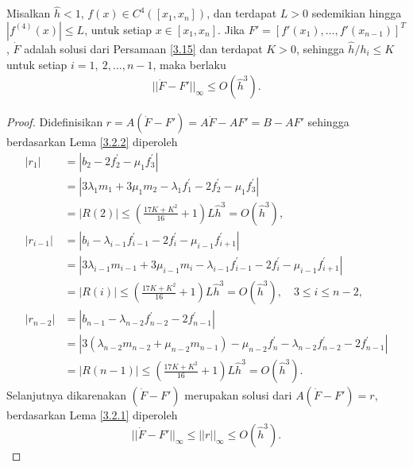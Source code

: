 \begin{teorema}\label{3.3.3}
    Misalkan $\hat{h}<1$, $f(x)\in C^4([x_1,x_n])$, dan terdapat $L>0$ sedemikian hingga $|f^{(4)}(x)| \leq L$, untuk setiap $x\in[x_1,x_n]$. Jika $F'=[f'(x_1),\dots,f'(x_{n-1})]^T$, $\dot{F}$ adalah solusi dari Persamaan \eqref{3.15} dan terdapat $K>0$, sehingga $\hat{h}/h_i \leq K$ untuk setiap $i=1,~2,\dots,n-1$, maka berlaku
    \begin{align*}
        ||\dot{F}-F'||_\infty \leq O(\hat{h}^3).
    \end{align*}
\end{teorema}
\begin{proof}
    Didefinisikan $r=A(\dot{F}-F')=A\dot{F}-AF'=B-AF'$ sehingga berdasarkan Lema \ref{3.2.2} diperoleh
    \begin{align*}
        |r_1|& =\left|b_2-2 f_2^{\prime}-\mu_1 f_3^{\prime}\right|\\
        &=\left|3 \lambda_1 m_1+3 \mu_1 m_2-\lambda_1 f_1^{\prime}-2 f_2^{\prime}-\mu_1 f_3^{\prime}\right|\\
        &=|R(2)|
         \leq\left(\frac{17 K+K^2}{16}+1\right) L \hat{h}^3=O\left(\hat{h}^3\right), \\
        \left|r_{i-1}\right| 
        & =\left|b_i-\lambda_{i-1} f_{i-1}^{\prime}-2 f_i^{\prime}-\mu_{i-1} f_{i+1}^{\prime}\right|\\
        &=\left|3 \lambda_{i-1} m_{i-1}+3 \mu_{i-1} m_i-\lambda_{i-1} f_{i-1}^{\prime}-2 f_i^{\prime}-\mu_{i-1} f_{i+1}^{\prime}\right|\\
        & =|R(i)| \leq\left(\frac{17 K+K^2}{16}+1\right) L \hat{h}^3=O\left(\hat{h}^3\right), \quad 3 \leq i \leq n-2, \\
        \left|r_{n-2}\right| & =\left|b_{n-1}-\lambda_{n-2} f_{n-2}^{\prime}-2 f_{n-1}^{\prime}\right|\\
        &=\left|3\left(\lambda_{n-2} m_{n-2}+\mu_{n-2} m_{n-1}\right)-\mu_{n-2} f_n^{\prime}-\lambda_{n-2} f_{n-2}^{\prime}-2 f_{n-1}^{\prime}\right| \\
        & =|R(n-1)| \leq\left(\frac{17 K+K^2}{16}+1\right) L \hat{h}^3=O\left(\hat{h}^3\right) .
    \end{align*}
    Selanjutnya dikarenakan $(\dot{F}-F')$ merupakan solusi dari $A(\dot{F}-F')=r$, berdasarkan Lema \ref{3.2.1} diperoleh
    \begin{equation*}
        ||\dot{F}-F'||_\infty \leq ||r||_\infty \leq O(\hat{h}^3).
    \end{equation*}
\end{proof}

